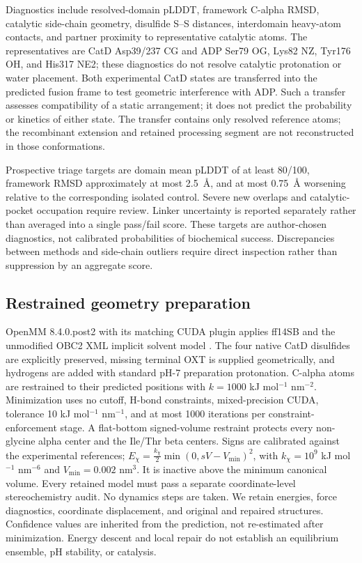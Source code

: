 \documentclass{article}
\newcommand{\angstrom}{\textup{\AA}}
\begin{document}
Diagnostics include resolved-domain pLDDT, framework C-alpha RMSD, catalytic
side-chain geometry, disulfide S--S distances, interdomain heavy-atom contacts,
and partner proximity to representative catalytic atoms. The representatives
are CatD Asp39/237 CG and ADP Ser79 OG, Lys82 NZ, Tyr176 OH, and His317 NE2;
these diagnostics do not resolve catalytic protonation or water placement.
Both experimental CatD states are
transferred into the predicted fusion frame to test geometric interference
with ADP. Such a transfer assesses compatibility of a static arrangement; it
does not predict the probability or kinetics of either state. The transfer
contains only resolved reference atoms; the recombinant extension and retained
processing segment are not reconstructed in those conformations.

Prospective triage targets are domain mean pLDDT of at least 80/100, framework
RMSD approximately at most 2.5~\angstrom, and at most 0.75~\angstrom{} worsening
relative to the corresponding isolated control. Severe new overlaps and
catalytic-pocket occupation require review. Linker uncertainty is reported
separately rather than averaged into a single pass/fail score. These targets
are author-chosen diagnostics, not calibrated probabilities of biochemical
success. Discrepancies between methods and side-chain outliers require direct
inspection rather than suppression by an aggregate score.

\subsection{Restrained geometry preparation}
OpenMM 8.4.0.post2 with its matching CUDA plugin applies ff14SB and the
unmodified OBC2 XML implicit solvent model \citep{eastman2024,maier2015,onufriev2004}.
The four native CatD disulfides are explicitly preserved, missing terminal
OXT is supplied geometrically, and hydrogens are added with standard pH-7
preparation protonation. C-alpha atoms are restrained to their predicted
positions with $k=1000$ kJ mol$^{-1}$ nm$^{-2}$. Minimization uses no cutoff,
H-bond constraints, mixed-precision CUDA, tolerance 10 kJ mol$^{-1}$ nm$^{-1}$,
and at most 1000 iterations per constraint-enforcement stage. A flat-bottom
signed-volume restraint protects every non-glycine alpha center and the
Ile/Thr beta centers. Signs are calibrated against the experimental references;
$E_\chi=\frac{k_\chi}{2}\min(0,sV-V_{\min})^2$, with
$k_\chi=10^9$ kJ mol$^{-1}$ nm$^{-6}$ and $V_{\min}=0.002$ nm$^3$.
It is inactive above the minimum canonical volume. Every retained model must
pass a separate coordinate-level stereochemistry audit. No dynamics steps
are taken. We retain energies, force diagnostics, coordinate displacement,
and original and repaired structures. Confidence values are inherited from
the prediction, not re-estimated after minimization. Energy descent and local
repair do not establish an equilibrium ensemble, pH stability, or catalysis.
\end{document}
